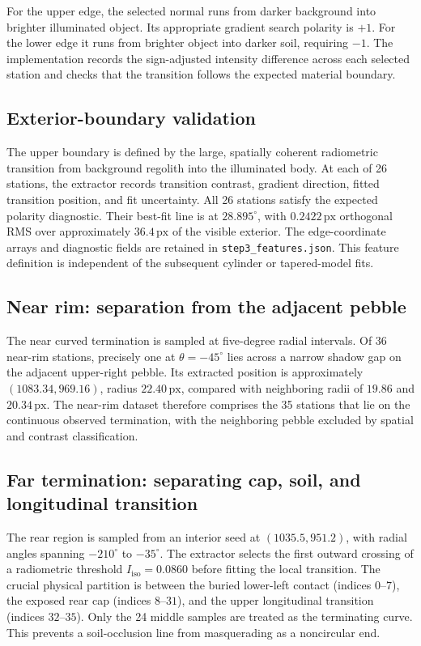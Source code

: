 \documentclass[11pt,letterpaper]{article}
\newcommand{\px}{\,\mathrm{px}}
\newcommand{\sourcepath}[1]{\nolinkurl{#1}}
\begin{document}
For the upper edge, the selected normal runs from darker background into brighter illuminated object. Its appropriate gradient search polarity is \(+1\). For the lower edge it runs from brighter object into darker soil, requiring \(-1\). The implementation records the sign-adjusted intensity difference across each selected station and checks that the transition follows the expected material boundary.

\subsection{Exterior-boundary validation}
\label{sec:exterior}

The upper boundary is defined by the large, spatially coherent radiometric transition from background regolith into the illuminated body. At each of 26 stations, the extractor records transition contrast, gradient direction, fitted transition position, and fit uncertainty. All 26 stations satisfy the expected polarity diagnostic. Their best-fit line is at $28.895^\circ$, with $0.2422\px$ orthogonal RMS over approximately $36.4\px$ of the visible exterior. The edge-coordinate arrays and diagnostic fields are retained in \sourcepath{step3_features.json}. This feature definition is independent of the subsequent cylinder or tapered-model fits.

\subsection{Near rim: separation from the adjacent pebble}

The near curved termination is sampled at five-degree radial intervals. Of 36 near-rim stations, precisely one at \(\theta=-45^\circ\) lies across a narrow shadow gap on the adjacent upper-right pebble. Its extracted position is approximately \((1083.34,969.16)\), radius \(22.40\px\), compared with neighboring radii of \(19.86\) and \(20.34\px\). The near-rim dataset therefore comprises the 35 stations that lie on the continuous observed termination, with the neighboring pebble excluded by spatial and contrast classification.

\subsection{Far termination: separating cap, soil, and longitudinal transition}

The rear region is sampled from an interior seed at \((1035.5,951.2)\), with radial angles spanning \(-210^\circ\) to \(-35^\circ\). The extractor selects the first outward crossing of a radiometric threshold \(I_{\mathrm{iso}}=0.0860\) before fitting the local transition. The crucial physical partition is between the buried lower-left contact (indices \(0\)--\(7\)), the exposed rear cap (indices \(8\)--\(31\)), and the upper longitudinal transition (indices \(32\)--\(35\)). Only the 24 middle samples are treated as the terminating curve. This prevents a soil-occlusion line from masquerading as a noncircular end.
\end{document}
